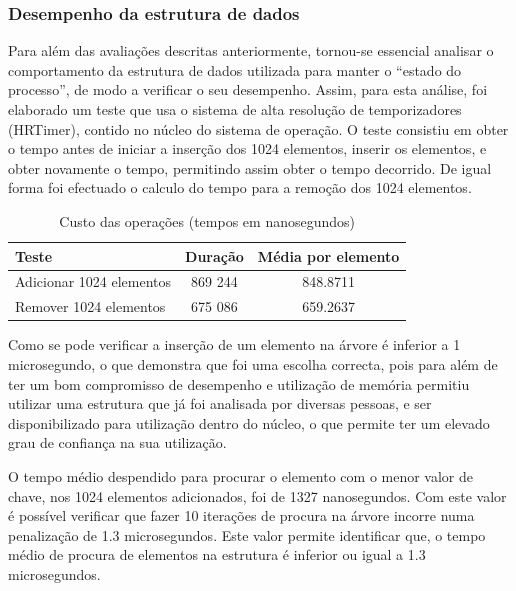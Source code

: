 \documentclass[a4paper]{llncs}
\begin{document}
\subsubsection{Desempenho da estrutura de dados}
Para além das avaliações descritas anteriormente, tornou-se essencial analisar o comportamento da estrutura de dados utilizada para manter o “estado do processo”, de modo a verificar o seu desempenho. 
Assim, para esta análise, foi elaborado um teste que usa o sistema de alta resolução de temporizadores (HRTimer), contido no núcleo do sistema de operação.
O teste consistiu em obter o tempo antes de iniciar a inserção dos 1024 elementos, inserir os elementos, e obter novamente o tempo, permitindo assim obter o tempo decorrido. De igual forma foi efectuado o calculo do tempo para a remoção dos 1024 elementos.

\begin{table}
\begin{center}

\begin{tabular}{ | l | c | c | }
\hline
\hspace{1.2cm} Teste \hspace{1cm} & \hspace{1cm}Duração\hspace{1cm} &  Média por
elemento \\
\hline
Adicionar 1024 elementos & 869 244 & 848.8711 \\
\hline
Remover 1024 elementos & 675 086 & 659.2637\\
\hline

\hline
\end{tabular}
\caption{Custo das operações (tempos em nanosegundos)}
\label{tab:tree_info}
\end{center}
\end{table}

Como se pode verificar a inserção de um elemento na árvore é inferior a 1 microsegundo, o que demonstra que foi uma escolha correcta, pois para além de ter um bom compromisso de desempenho e utilização de memória permitiu utilizar uma estrutura que já foi analisada por diversas pessoas, e ser disponibilizado para utilização dentro do núcleo, o que permite ter um elevado grau de confiança na sua utilização.

O tempo médio despendido para procurar o elemento com o menor valor de chave, nos 1024 elementos adicionados, foi de 1327 nanosegundos. Com este valor é possível verificar que fazer 10 iterações de procura na árvore incorre numa penalização de 1.3 microsegundos. Este valor permite identificar que, o tempo médio de procura de elementos na estrutura é inferior ou igual a 1.3 microsegundos.
\end{document}

